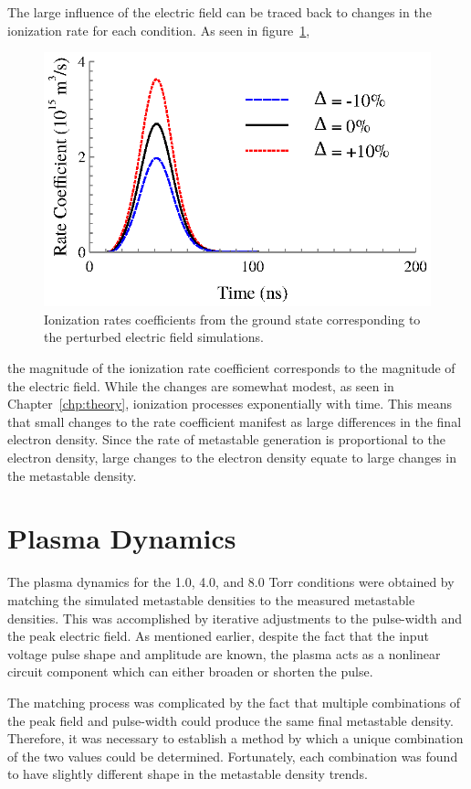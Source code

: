 The large influence of the electric field can be traced back to changes in the
ionization rate for each condition. As seen in figure~\ref{fig:ionrates},
\begin{figure}
  \centering
  \includegraphics{./chapters/modeling/figures/ionrates.eps}
  \caption{Ionization rates coefficients from the ground state corresponding to
    the perturbed electric field simulations.}
  \label{fig:ionrates}
\end{figure}
the magnitude of the ionization rate coefficient corresponds to the magnitude of
the electric field. While the changes are somewhat modest, as seen in
Chapter~\ref{chp:theory}, ionization processes exponentially with time. This
means that small changes to the rate coefficient manifest as large differences
in the final electron density. Since the rate of metastable generation is
proportional to the electron density, large changes to the electron density
equate to large changes in the metastable density.

\section{Plasma Dynamics}

The plasma dynamics for the 1.0, 4.0, and 8.0 Torr conditions were obtained by
matching the simulated metastable densities to the measured metastable
densities. This was accomplished by iterative adjustments to the pulse-width and
the peak electric field. As mentioned earlier, despite the fact that the input
voltage pulse shape and amplitude are known, the plasma acts as a nonlinear
circuit component which can either broaden or shorten the pulse.

The matching process was complicated by the fact that multiple combinations of
the peak field and pulse-width could produce the same final metastable density.
Therefore, it was necessary to establish a method by which a unique combination
of the two values could be determined. Fortunately, each combination was found
to have slightly different shape in the metastable density trends.

